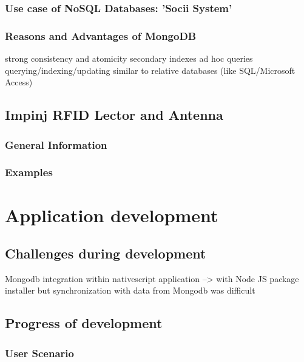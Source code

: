 \subsubsection{Use case of NoSQL Databases: 'Socii System'}

\cite{trends_nosql}

\subsubsection{Reasons and Advantages of MongoDB}

\cite{mongodb_edward}

strong consistency and atomicity
secondary indexes 
ad hoc queries
querying/indexing/updating similar to relative databases (like SQL/Microsoft Access)

\subsection{Impinj RFID Lector and Antenna}

\subsubsection{General Information}

\subsubsection{Examples}

%
%
\section{Application development}

\subsection{Challenges during development}

Mongodb integration within nativescript application 
--> with Node JS package installer 
but synchronization with data from Mongodb was difficult

\subsection{Progress of development}

\subsubsection{User Scenario}

